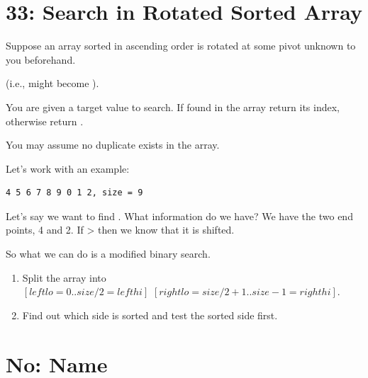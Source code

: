 \section{33: Search in Rotated Sorted Array
  \label{secAlgoP33SearchInRotSortArry}}

Suppose an array sorted in ascending order is rotated at some pivot unknown
to you beforehand.

(i.e.,  might become ).

You are given a target value to search. If found in the array return its
index, otherwise return .

You may assume no duplicate exists in the array.

\rrsepline{}

Let's work with an example:
\begin{lstlisting}[style=raycppnewsnippet]
4 5 6 7 8 9 0 1 2, size = 9
\end{lstlisting}
Let's say we want to find . What information do we have? We have the
two end points, 4 and 2. If  >  then we know that it is
shifted.

So what we can do is a modified binary search.
\begin{enumerate}[label=\textbf{\arabic*.},noitemsep,topsep=0pt]
\item Split the array into\\
  $[leftlo = 0..size / 2 = lefthi]$  $[rightlo=size/2+1..size-1=righthi]$.
\item Find out which side is sorted and test the sorted side first.

\end{enumerate}




\section{No: Name
  \label{secAlgoPNumName}}



\rrsepline{}











































